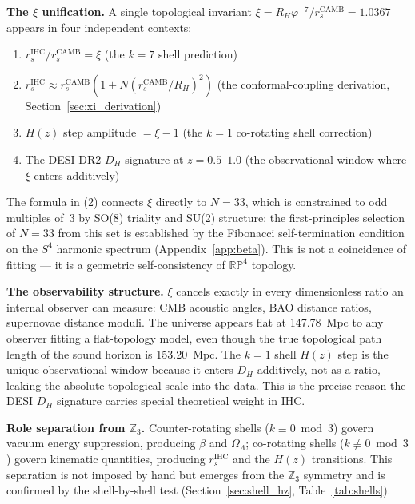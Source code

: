 \documentclass[12pt,a4paper]{article}
\begin{document}
\textbf{The $\xi$ unification.} A single topological invariant
$\xi = R_H\varphi^{-7}/r_s^\mathrm{CAMB} = 1.0367$ appears in four independent contexts:
\begin{enumerate}
  \item $r_s^\mathrm{IHC}/r_s^\mathrm{CAMB} = \xi$ \quad (the $k=7$ shell prediction)
  \item $r_s^\mathrm{IHC} \approx r_s^\mathrm{CAMB}(1+N(r_s^\mathrm{CAMB}/R_H)^2)$ \quad (the conformal-coupling derivation, Section~\ref{sec:xi_derivation})
  \item $H(z)$ step amplitude $= \xi - 1$ \quad (the $k=1$ co-rotating shell correction)
  \item The DESI DR2 $D_H$ signature at $z = 0.5$--$1.0$ \quad (the observational window where $\xi$ enters additively)
\end{enumerate}
The formula in (2) connects $\xi$ directly to $N = 33$, which is constrained to
odd multiples of~3 by SO(8) triality and SU(2) structure; the first-principles
selection of $N=33$ from this set is established by the Fibonacci self-termination
condition on the $S^4$ harmonic spectrum (Appendix~\ref{app:beta}).
This is not a coincidence of fitting --- it is a geometric self-consistency of
$\mathbb{RP}^4$ topology.

\textbf{The observability structure.} $\xi$ cancels exactly in every dimensionless
ratio an internal observer can measure: CMB acoustic angles, BAO distance ratios,
supernovae distance moduli. The universe appears flat at 147.78~Mpc to any
observer fitting a flat-topology model, even though the true topological path
length of the sound horizon is 153.20~Mpc. The $k=1$ shell $H(z)$ step is the
unique observational window because it enters $D_H$ additively, not as a ratio,
leaking the absolute topological scale into the data. This is the precise reason
the DESI $D_H$ signature carries special theoretical weight in IHC.

\textbf{Role separation from $\mathbb{Z}_3$.} Counter-rotating shells
($k \equiv 0 \bmod 3$) govern vacuum energy suppression, producing $\beta$ and
$\Omega_\Lambda$; co-rotating shells ($k \not\equiv 0 \bmod 3$) govern kinematic
quantities, producing $r_s^\mathrm{IHC}$ and the $H(z)$ transitions. This
separation is not imposed by hand but emerges from the $\mathbb{Z}_3$ symmetry and
is confirmed by the shell-by-shell test (Section~\ref{sec:shell_hz}, Table~\ref{tab:shells}).
\end{document}
